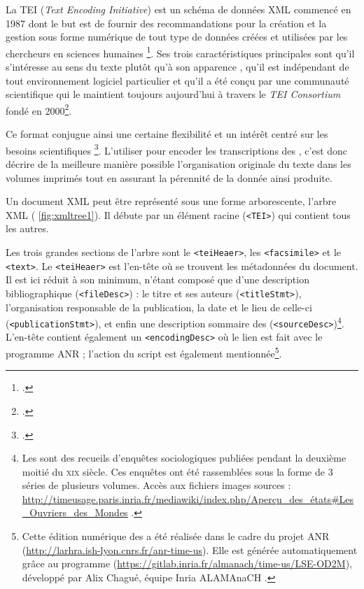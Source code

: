 La TEI (\textit{Text Encoding Initiative}) est un schéma de données XML commencé en 1987 dont le but est de \og fournir des recommandations pour la création et la gestion sous forme numérique de tout type de données créées et utilisées par les chercheurs en sciences humaines \fg\footcite[p. 9]{burnard}. Ses trois caractéristiques principales sont qu'il \og s’intéresse au sens du texte plutôt qu'à son apparence \fg, qu'il est \og indépendant de tout environnement logiciel particulier \fg{} et qu'il a été conçu par une communauté scientifique qui le maintient toujours aujourd'hui à travers le \textit{TEI Consortium} fondé en 2000\footcite[p. 9]{burnard}. 

Ce format conjugue ainsi une certaine \og flexibilité et un intérêt centré sur les besoins scientifiques \fg\footcite[p. 10]{burnard}. L'utiliser pour encoder les transcriptions des \odm, c'est donc décrire de la meilleure manière possible l'organisation originale du texte dans les volumes imprimés tout en assurant la pérennité de la donnée ainsi produite.

Un document XML peut être représenté sous une forme arborescente, \og l'arbre XML \fg{} (\fig{} \ref{fig:xmltree1}). Il débute par un élément racine (\texttt{<TEI>}) qui contient tous les autres.

Les trois grandes sections de l'arbre sont le \texttt{<teiHeaer>}, les \texttt{<facsimile>} et le \texttt{<text>}. Le \texttt{<teiHeaer>} est l'en-tête où se trouvent les métadonnées du document. Il est ici réduit à son minimum, n'étant composé que d'une description bibliographique (\texttt{<fileDesc>}) : le titre et ses auteurs (\texttt{<titleStmt>}), l'organisation responsable de la publication, la date et le lieu de celle-ci (\texttt{<publicationStmt>}), et enfin une description sommaire des \odm{} (\texttt{<sourceDesc>})\footnote{\og Les \odm{} sont des recueils d'enquêtes sociologiques publiées pendant la deuxième moitié du \textsc{xix}\ieme{} siècle. Ces enquêtes ont été rassemblées sous la forme de 3 séries de plusieurs volumes. Accès aux fichiers images sources : \url{http://timeusage.paris.inria.fr/mediawiki/index.php/Aperçu_des_états\#Les_Ouvriers_des_Mondes} \fg.}. L'en-tête contient également un \texttt{<encodingDesc>} où le lien est fait avec le programme ANR ; l'action du script \lse{} est également mentionnée\footnote{\og Cette édition numérique des \odm{} a été réalisée dans le cadre du projet ANR \timeus{} (\url{http://larhra.ish-lyon.cnrs.fr/anr-time-us}). Elle est générée automatiquement grâce au programme \lse{} (\url{https://gitlab.inria.fr/almanach/time-us/LSE-OD2M}), développé par Alix Chagué, équipe Inria ALAMAnaCH \fg.}.

